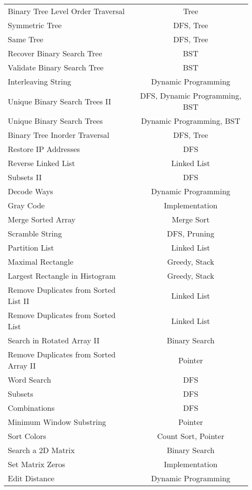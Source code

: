 \documentclass[paper=a4, fontsize=11pt]{scrartcl} %
\begin{document}
\begin{center}
\begin{longtable}{|l|c|}
    Binary Tree Level Order Traversal   &   Tree  \\
    Symmetric Tree  &   DFS, Tree   \\
    Same Tree   &   DFS, Tree   \\
    Recover Binary Search Tree  &   BST \\
    Validate Binary Search Tree &   BST \\
    Interleaving String &   Dynamic Programming \\
    Unique Binary Search Trees II   &   DFS, Dynamic Programming, BST \\
    Unique Binary Search Trees  &   Dynamic Programming, BST \\   
    Binary Tree Inorder Traversal   &   DFS, Tree  \\
    Restore IP Addresses    &   DFS  \\
    Reverse Linked List &   Linked List \\
    Subsets II  &   DFS  \\
    Decode Ways &   Dynamic Programming \\
    Gray Code   &   Implementation  \\
    Merge Sorted Array  &   Merge Sort  \\
    Scramble String &   DFS, Pruning \\
    Partition List  &   Linked List \\
    Maximal Rectangle   &   Greedy, Stack   \\
    Largest Rectangle in Histogram  &   Greedy, Stack  \\
    Remove Duplicates from Sorted List II &   Linked List \\
    Remove Duplicates from Sorted List  &   Linked List \\
    Search in Rotated Array II  &   Binary Search   \\
    Remove Duplicates from Sorted Array II  &  Pointer  \\
    Word Search &   DFS  \\
    Subsets &   DFS  \\
    Combinations    &   DFS  \\
    Minimum Window Substring    &   Pointer \\
    Sort Colors &   Count Sort, Pointer  \\
    Search a 2D Matrix  &   Binary Search   \\
    Set Matrix Zeros    &   Implementation  \\
    Edit Distance   &   Dynamic Programming \\

\end{longtable}
\end{center}
\end{document}
